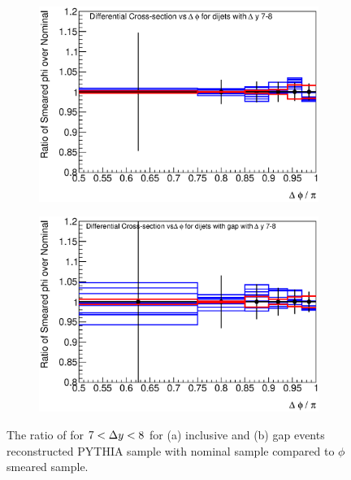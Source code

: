 \begin{figure}
\centering
        \begin{subfigure}[b]{0.5\textwidth}
                \centering
                \includegraphics[width=\textwidth]{figures/GBJ2/ResoPhi/RMS_phi___dPhi__7_8_Ratio.eps}
        \end{subfigure}%
        \begin{subfigure}[b]{0.5\textwidth}
                \centering
                \includegraphics[width=\textwidth]{figures/GBJ2/ResoPhi/RMS_phi___dPhi_gap__7_8_Ratio.eps}
        \end{subfigure}%
\caption[Uncertainty bands due to the jet $\phi$ resolution for \dphiDist{} for $7<\dy{}<8$]{
The ratio of \dphiDist{} for $7<\dy{}<8$ for (a) inclusive and (b) gap events reconstructed PYTHIA sample with nominal sample compared to $\phi$ smeared sample.
\label{GBJ2:ResoPhi:dphi78}}
\end{figure}


